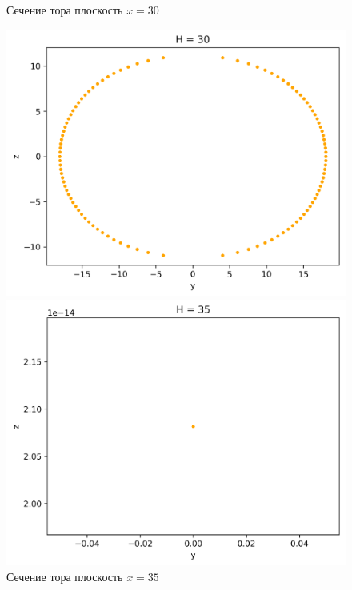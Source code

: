 \documentclass[a4]{article}
\begin{document}
\begin{figure}[H]
\caption{Сечение тора плоскость $x=30$ }
\includegraphics[scale=0.9]{TS30.png}

\caption{Сечение тора плоскость $x=35$ }
\includegraphics[scale=0.9]{TS35.png} 
\end{figure}
\end{document}
